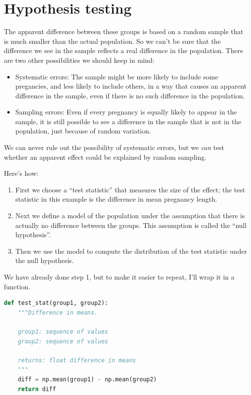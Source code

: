 \hypertarget{hypothesis-testing}{%
\section{Hypothesis testing}\label{hypothesis-testing}}

The apparent difference between these groups is based on a random sample
that is much smaller than the actual population. So we can't be sure
that the difference we see in the sample reflects a real difference in
the population. There are two other possibilities we should keep in
mind:

\begin{itemize}
\item
  Systematic errors: The sample might be more likely to include some
  pregancies, and less likely to include others, in a way that causes an
  apparent difference in the sample, even if there is no such difference
  in the population.
\item
  Sampling errors: Even if every pregnancy is equally likely to appear
  in the sample, it is still possible to see a difference in the sample
  that is not in the population, just because of random variation.
\end{itemize}

We can never rule out the possibility of systematic errors, but we
\emph{can} test whether an apparent effect could be explained by random
sampling.

Here's how:

\begin{enumerate}
\def\labelenumi{\arabic{enumi}.}
\item
  First we choose a ``test statistic'' that measures the size of the
  effect; the test statistic in this example is the difference in mean
  pregnancy length.
\item
  Next we define a model of the population under the assumption that
  there is actually no difference between the groups. This assumption is
  called the ``null hypothesis''.
\item
  Then we use the model to compute the distribution of the test
  statistic under the null hypothesis.
\end{enumerate}

We have already done step 1, but to make it easier to repeat, I'll wrap
it in a function.

\begin{lstlisting}[language=Python,style=source]
def test_stat(group1, group2):
    """Difference in means.
    
    group1: sequence of values
    group2: sequence of values
    
    returns: float difference in means
    """
    diff = np.mean(group1) - np.mean(group2)
    return diff
\end{lstlisting}

